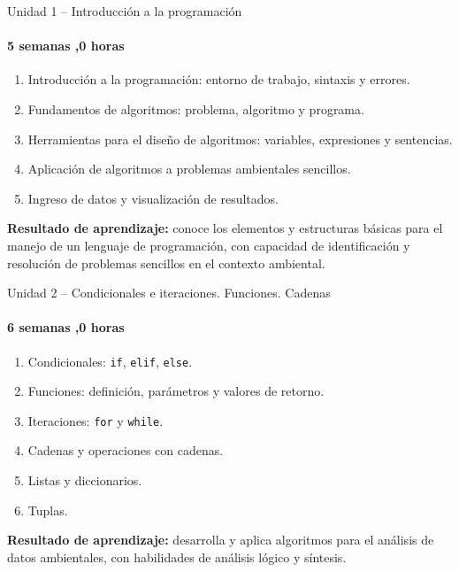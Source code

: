 \documentclass[aspectratio=169,11pt]{beamer}
\begin{document}
\begin{frame}{Unidad 1 -- Introducción a la programación}
\framesubtitle{5 semanas \quad\textbullet{},0 horas}
\begin{enumerate}
  \item Introducción a la programación: entorno de trabajo, sintaxis y errores.
  \item Fundamentos de algoritmos: problema, algoritmo y programa.
  \item Herramientas para el diseño de algoritmos: variables, expresiones y sentencias.
  \item Aplicación de algoritmos a problemas ambientales sencillos.
  \item Ingreso de datos y visualización de resultados.
\end{enumerate}
\vspace{0.1cm}
\begin{keybox}[top=2pt,bottom=2pt]
\footnotesize\textbf{Resultado de aprendizaje:} conoce los elementos y estructuras básicas para el manejo de un lenguaje de programación, con capacidad de identificación y resolución de problemas sencillos en el contexto ambiental.
\end{keybox}
\end{frame}

\begin{frame}{Unidad 2 -- Condicionales e iteraciones. Funciones. Cadenas}
\framesubtitle{6 semanas \quad\textbullet{},0 horas}
\begin{enumerate}
  \item Condicionales: \texttt{if}, \texttt{elif}, \texttt{else}.
  \item Funciones: definición, parámetros y valores de retorno.
  \item Iteraciones: \texttt{for} y \texttt{while}.
  \item Cadenas y operaciones con cadenas.
  \item Listas y diccionarios.
  \item Tuplas.
\end{enumerate}
\vspace{0.1cm}
\begin{keybox}[top=2pt,bottom=2pt]
\footnotesize\textbf{Resultado de aprendizaje:} desarrolla y aplica algoritmos para el análisis de datos ambientales, con habilidades de análisis lógico y síntesis.
\end{keybox}
\end{frame}
\end{document}
